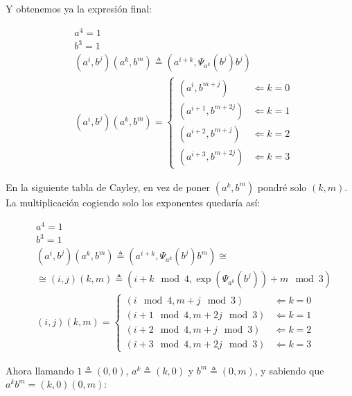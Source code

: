 \documentclass[12pt,a4paper,fleqn,spanish,final,openright]{extbook}
\theoremstyle{definition}
\theoremstyle{remark}
\begin{document}
Y obtenemos ya la expresión final:


\begin{align*}
& a^4=1 \\
& b^3=1 \\
& (a^i,b^j)(a^k,b^m) \triangleq (a^{i+k} ,{\Psi}_{a^k}(b^j) {b^{j}}) \\
&
(a^i,b^j)(a^k,b^m) = 
	\begin{cases}
		\left( a^{i  } , {b^{m+j}}  \right)   &\Leftarrow k=0\\
		\left( a^{i+1} , {b^{m+2j}} \right)   &\Leftarrow k=1\\
		\left( a^{i+2} , {b^{m+j}}  \right)   &\Leftarrow k=2\\
		\left( a^{i+3} , {b^{m+2j}} \right)   &\Leftarrow k=3
	\end{cases} 
\end{align*}


En la siguiente tabla de Cayley, en vez de poner $(a^k,b^m)$ 
pondré solo $(k,m)$. La multiplicación cogiendo solo los 
exponentes quedaría así:


\begin{align*}
& a^4=1 \\
& b^3=1 \\
& (a^i,b^j)(a^k,b^m) \triangleq (a^{i+k} ,{\Psi}_{a^k}(b^j) {b^{m}}) \cong\\
& \cong  (i,j)(k,m) \triangleq ({i+k}\mod 4 ,\exp{({\Psi}_{a^k}(b^j))}+m \mod 3) \\
&
(i,j)(k,m) = 
	\begin{cases}
		\left( {i  }\mod 4 , {m+j}  \mod 3 \right)   &\Leftarrow k=0\\
		\left( {i+1}\mod 4 , {m+2j} \mod 3 \right)   &\Leftarrow k=1\\
		\left( {i+2}\mod 4 , {m+j}  \mod 3 \right)   &\Leftarrow k=2\\
		\left( {i+3}\mod 4 , {m+2j} \mod 3 \right)   &\Leftarrow k=3
	\end{cases} 
\end{align*}

Ahora llamando $1 \triangleq (0,0)$, $a^k \triangleq (k,0)$ y $b^m \triangleq (0,m)$, y sabiendo que $a^k b^m = (k,0)(0,m)$:
\\
\end{document}

